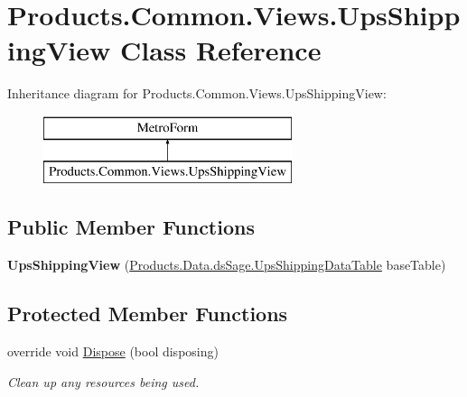 \hypertarget{class_products_1_1_common_1_1_views_1_1_ups_shipping_view}{}\section{Products.\+Common.\+Views.\+Ups\+Shipping\+View Class Reference}
\label{class_products_1_1_common_1_1_views_1_1_ups_shipping_view}
Inheritance diagram for Products.\+Common.\+Views.\+Ups\+Shipping\+View\+:\begin{figure}[H]
\begin{center}
\leavevmode
\includegraphics[height=2.000000cm]{class_products_1_1_common_1_1_views_1_1_ups_shipping_view}
\end{center}
\end{figure}
\subsection*{Public Member Functions}
\begin{DoxyCompactItemize}
\item 
{\bfseries Ups\+Shipping\+View} (\hyperlink{class_products_1_1_data_1_1ds_sage_1_1_ups_shipping_data_table}{Products.\+Data.\+ds\+Sage.\+Ups\+Shipping\+Data\+Table} base\+Table)\hypertarget{class_products_1_1_common_1_1_views_1_1_ups_shipping_view_a7436e6ce46d04c3da7aebe1a007c47a0}{}\label{class_products_1_1_common_1_1_views_1_1_ups_shipping_view_a7436e6ce46d04c3da7aebe1a007c47a0}

\end{DoxyCompactItemize}
\subsection*{Protected Member Functions}
\begin{DoxyCompactItemize}
\item 
override void \hyperlink{class_products_1_1_common_1_1_views_1_1_ups_shipping_view_a4ca7e6f78802e8a516ba9d2f3f871134}{Dispose} (bool disposing)
\begin{DoxyCompactList}\small\item\em Clean up any resources being used. \end{DoxyCompactList}\end{DoxyCompactItemize}


